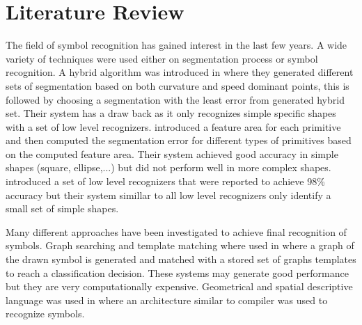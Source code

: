 \documentclass[a4paper,10pt]{IEEEconf}
\begin{document}
\section{Literature Review}
\label{Sec:RelatedWork}
The field of symbol recognition has gained interest in the last few years. A wide variety of techniques were used either on segmentation process or symbol recognition.
A hybrid algorithm was introduced in \cite{earlyprocess} where they generated different sets of segmentation based on both curvature and speed dominant points, this is followed by choosing a segmentation with the least error from generated hybrid set. Their system has a draw back as it only recognizes simple specific shapes with a set of low level recognizers. \cite{meanshift10} introduced a feature area for each primitive and then computed the segmentation error for different types of primitives based on the computed feature area. Their system achieved good accuracy in simple shapes (square, ellipse,...) but did not perform well in more complex shapes\cite{meanshift10,Paleosketch08}. \citeauthor{Paleosketch08} \cite{Paleosketch08} introduced a set of low level recognizers that were reported to achieve 98\%  accuracy but their system simillar to all low level recognizers only identify a small set of simple shapes. 

Many different approaches have been investigated to achieve final recognition of symbols. Graph searching and template matching where used in \cite{GraphBased07} where a graph of the drawn symbol is generated and matched with a stored set of graphs templates to reach a classification decision. These systems may generate good performance but they are very computationally expensive. Geometrical and spatial descriptive language was used in \cite{SketchRead2007,Ladder30} where an architecture similar to compiler was used to recognize symbols. %
\end{document}
